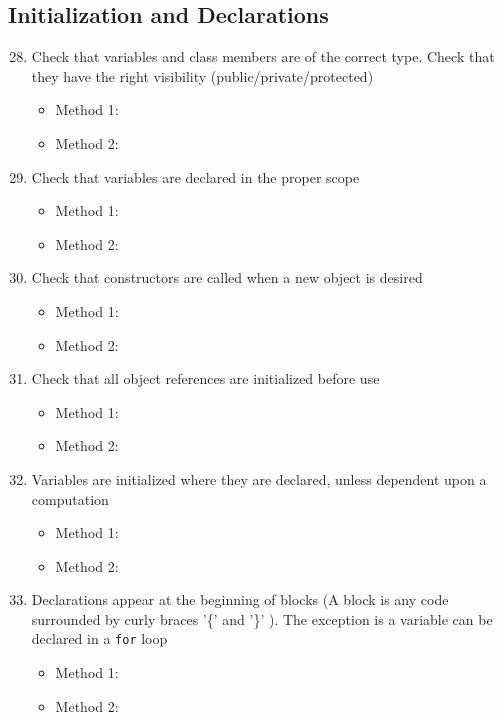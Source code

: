 \subsection{Initialization and Declarations}
\begin{enumerate}
\setcounter{enumi}{27}
	\item Check that variables and class members are of the correct type. Check that they have the right visibility (public/private/protected)
	\begin{itemize}
	 	\item Method 1: \cmark
 		\item Method 2: 
	\end{itemize}
	\item Check that variables are declared in the proper scope
	\begin{itemize}
	 	\item Method 1: \cmark
 		\item Method 2: 
	\end{itemize}
	\item Check that constructors are called when a new object is desired
	\begin{itemize}
	 	\item Method 1: \cmark
 		\item Method 2: 
	\end{itemize}
	\item Check that all object references are initialized before use
	\begin{itemize}
	 	\item Method 1: \cmark
 		\item Method 2: 
	\end{itemize}
	\item Variables are initialized where they are declared, unless dependent upon a computation
	\begin{itemize}
	 	\item Method 1: \cmark
 		\item Method 2: 
	\end{itemize}
	\item Declarations appear at the beginning of blocks (A block is any code surrounded by curly braces '\{' and '\}' ). The exception is a variable can be declared in a \texttt{for} loop
	\begin{itemize}
	 	\item Method 1: \cmark
 		\item Method 2: 
	\end{itemize}
\end{enumerate}